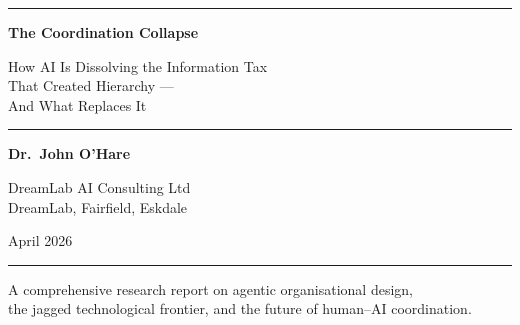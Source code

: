 \documentclass[12pt,a4paper,openright]{book}
\begin{document}
\begin{titlepage}
\begin{center}

\vspace*{2cm}

{\color{accentgold}\rule{\textwidth}{2pt}}

\vspace{1.5cm}

{\fontsize{28}{34}\selectfont\bfseries\color{navyblue}
The Coordination Collapse}

\vspace{0.8cm}

{\fontsize{16}{20}\selectfont\color{navyblue!80!black}
How AI Is Dissolving the Information Tax\\
That Created Hierarchy ---\\
And What Replaces It}

\vspace{1.2cm}

{\color{accentgold}\rule{0.4\textwidth}{1pt}}

\vspace{1.2cm}

{\Large\bfseries Dr.\ John O'Hare}

\vspace{0.4cm}

{\large\color{navyblue!70!black}
DreamLab AI Consulting Ltd\\
DreamLab, Fairfield, Eskdale}

\vspace{1.5cm}

{\large April 2026}

\vspace{2cm}

{\color{accentgold}\rule{\textwidth}{2pt}}

\vfill

{\small\color{navyblue!50!black}
A comprehensive research report on agentic organisational design,\\
the jagged technological frontier, and the future of human--AI coordination.}

\end{center}
\end{titlepage}

\frontmatter
\pagestyle{plain}

\tableofcontents
\listoffigures
\listoftables
\end{document}
